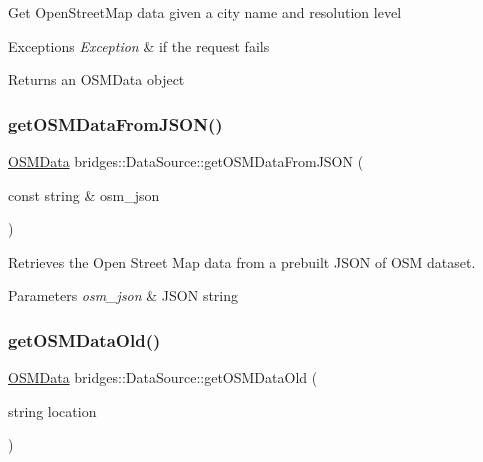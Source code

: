 Get Open\+Street\+Map data given a city name and resolution level


\begin{DoxyExceptions}{Exceptions}
{\em Exception} & if the request fails\\
\hline
\end{DoxyExceptions}
\begin{DoxyReturn}{Returns}
an O\+S\+M\+Data object 
\end{DoxyReturn}
\mbox{\label{classbridges_1_1_data_source_a1b483de1cce9921b70116213382cdaf0}} 
\subsubsection{\texorpdfstring{getOSMDataFromJSON()}{getOSMDataFromJSON()}}
{\footnotesize\ttfamily \mbox{\hyperlink{classbridges_1_1dataset_1_1_o_s_m_data}{O\+S\+M\+Data}} bridges\+::\+Data\+Source\+::get\+O\+S\+M\+Data\+From\+J\+S\+ON (\begin{DoxyParamCaption}\item[{const string \&}]{osm\+\_\+json }\end{DoxyParamCaption})\hspace{0.3cm}{\ttfamily [inline]}}

Retrieves the Open Street Map data from a prebuilt J\+S\+ON of O\+SM dataset.


\begin{DoxyParams}{Parameters}
{\em osm\+\_\+json} & J\+S\+ON string \\
\hline
\end{DoxyParams}
\mbox{\label{classbridges_1_1_data_source_a3ae5e11e0b70bed0498cf37b360820c2}} 
\subsubsection{\texorpdfstring{getOSMDataOld()}{getOSMDataOld()}}
{\footnotesize\ttfamily \mbox{\hyperlink{classbridges_1_1dataset_1_1_o_s_m_data}{O\+S\+M\+Data}} bridges\+::\+Data\+Source\+::get\+O\+S\+M\+Data\+Old (\begin{DoxyParamCaption}\item[{string}]{location }\end{DoxyParamCaption})\hspace{0.3cm}{\ttfamily [inline]}}



